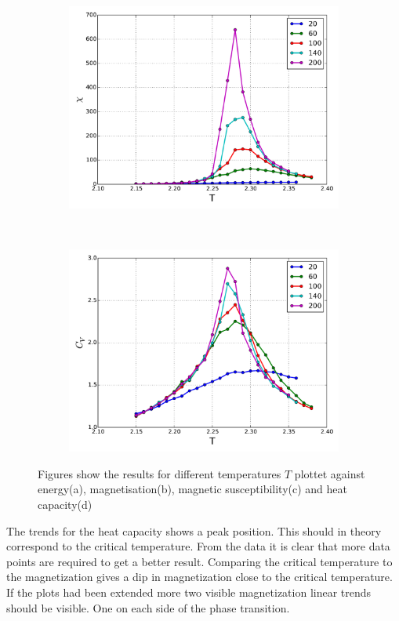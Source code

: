 \begin{figure}[H]
\begin{subfigure}{0.5\textwidth}
    	\includegraphics[width=\linewidth]{result/bilder/Tc/chi-Tc}
    	\caption{}
    \end{subfigure}%
    ~ 
    \begin{subfigure}{0.5\textwidth}
    	\centering
    	\includegraphics[width=\linewidth]{result/bilder/Tc/cv-Tc}
    	\caption{}
    \end{subfigure}
    \caption{Figures show the results for different temperatures $T$ plottet against energy(a), magnetisation(b), magnetic susceptibility(c) and heat capacity(d)}
    \label{fig:tc-chi-cv}
\end{figure}

The trends for the heat capacity shows a peak position. This should in theory correspond to the critical temperature. From the data it is clear that more data points are required to get a better result. Comparing the critical temperature to the magnetization gives a dip in magnetization close to the critical temperature. If the plots had been extended more two visible magnetization linear trends should be visible. One on each side of the phase transition. 










